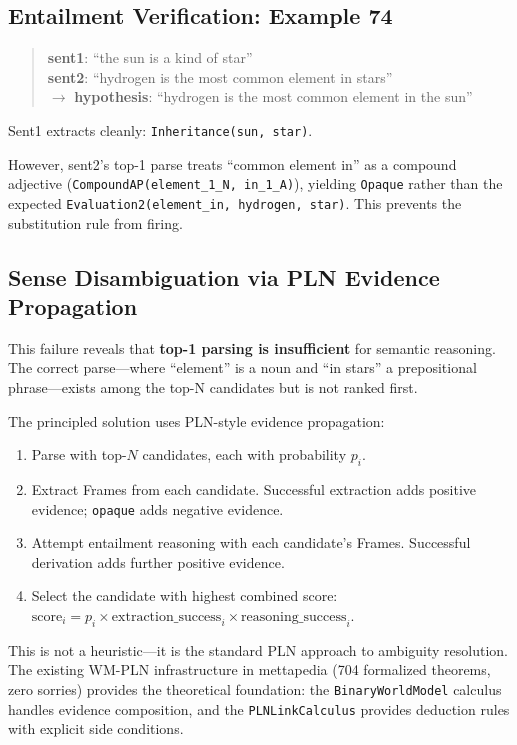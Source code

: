 \documentclass[]{article}
\newcommand{\code}[1]{\texttt{#1}}
\begin{document}
\subsection{Entailment Verification: Example 74}

\begin{quote}
\textbf{sent1}: ``the sun is a kind of star'' \\
\textbf{sent2}: ``hydrogen is the most common element in stars'' \\
$\to$ \textbf{hypothesis}: ``hydrogen is the most common element in the sun''
\end{quote}

Sent1 extracts cleanly: \code{Inheritance(sun, star)}.

However, sent2's top-1 parse treats ``common element in'' as a compound
adjective (\code{CompoundAP(element\_1\_N, in\_1\_A)}), yielding
\code{Opaque} rather than the expected \code{Evaluation2(element\_in,
hydrogen, star)}. This prevents the substitution rule from firing.

\subsection{Sense Disambiguation via PLN Evidence Propagation}

This failure reveals that \textbf{top-1 parsing is insufficient} for
semantic reasoning. The correct parse---where ``element'' is a noun
and ``in stars'' a prepositional phrase---exists among the top-N
candidates but is not ranked first.

The principled solution uses PLN-style evidence propagation:

\begin{enumerate}
\item Parse with top-$N$ candidates, each with probability $p_i$.
\item Extract Frames from each candidate.
  Successful extraction adds positive evidence; \code{opaque}
  adds negative evidence.
\item Attempt entailment reasoning with each candidate's Frames.
  Successful derivation adds further positive evidence.
\item Select the candidate with highest combined score:
  $\text{score}_i = p_i \times \text{extraction\_success}_i \times
  \text{reasoning\_success}_i$.
\end{enumerate}

This is not a heuristic---it is the standard PLN approach to
ambiguity resolution. The existing WM-PLN infrastructure in
mettapedia (704 formalized theorems, zero sorries) provides the
theoretical foundation: the \code{BinaryWorldModel} calculus handles
evidence composition, and the \code{PLNLinkCalculus} provides
deduction rules with explicit side conditions.
\end{document}
